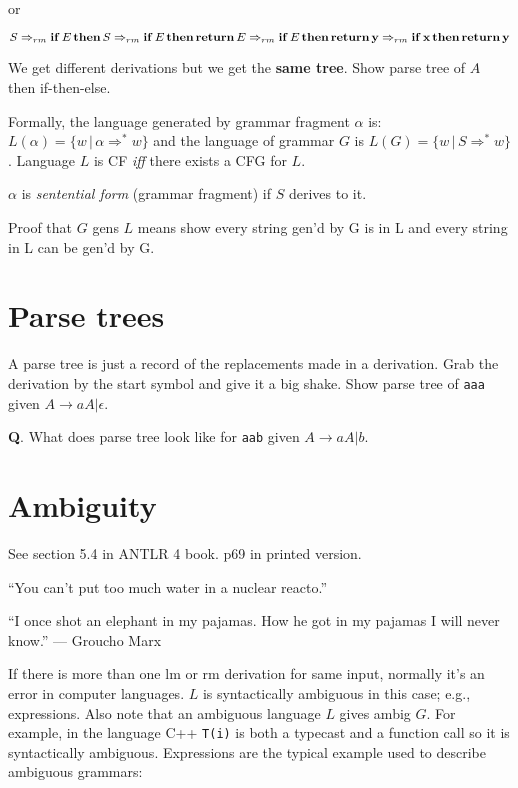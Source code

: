 \documentclass[11pt,twocolumn,nocopyright]{sigplanconf}
\begin{document}
\noindent or

\noindent $S \Rightarrow_{rm} {\bf if}\, E\, {\bf then}\, S \\
\Rightarrow_{rm} {\bf if}\, E\, {\bf then}\, {\bf return}\, E \\
\Rightarrow_{rm} {\bf if}\, E\, {\bf then}\, {\bf return}\, {\bf y}\\
\Rightarrow_{rm} {\bf if}\, {\bf x}\, {\bf then}\, {\bf return}\, {\bf y}$

We get different derivations but we get the {\bf same tree}. Show parse tree of $A$ then if-then-else.

Formally, the language generated by grammar fragment $\alpha$ is: $L(\alpha)=\{ w \, | \, \alpha \Rightarrow^* w\}$ and the language of grammar $G$ is $L(G) = \{ w \, | \, S \Rightarrow^* w\}$. Language $L$ is CF {\em iff} there exists a CFG for $L$.

$\alpha$ is {\em sentential form} (grammar fragment) if $S$ derives to it.

Proof that $G$ gens $L$ means show every string gen'd by G is in L and every string in L can be gen'd by G.

\section{Parse trees}

A parse tree is just a record of the replacements made in a derivation. Grab the derivation by the start symbol and give it a big shake.  Show parse tree of {\tt aaa} given $A \rightarrow a A | \epsilon$.

{\bf Q}. What does parse tree look like for {\tt aab} given $A \rightarrow a A | b$.

\section{Ambiguity}

See section 5.4 in ANTLR 4 book. p69 in printed version.

``You can't put too much water in a nuclear reacto.'' 

``I once shot an elephant in my pajamas. How he got in my pajamas I will never know.'' --- Groucho Marx

If there is more than one lm or rm derivation for same input, normally it's an error in computer languages. $L$ is syntactically ambiguous in this case; e.g., expressions.  Also note that an ambiguous language $L$ gives ambig $G$.  For example, in the language C++ {\tt T(i)} is both a typecast and a function call so it is syntactically ambiguous. Expressions are the typical example used to describe ambiguous grammars:\\
\end{document}
